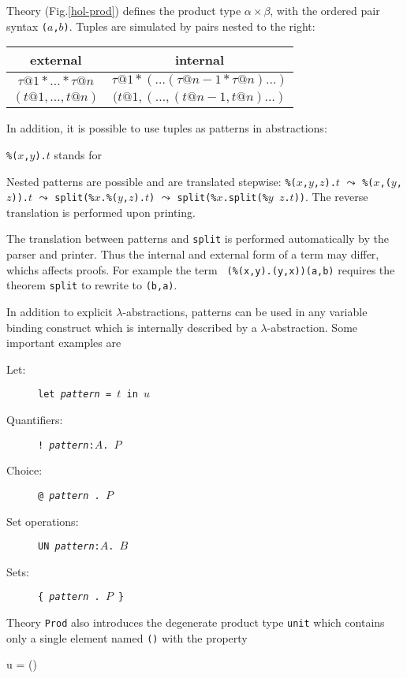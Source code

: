 Theory  (Fig.\ts\ref{hol-prod}) defines the product type
$\alpha\times\beta$, with the ordered pair syntax {\tt($a$,$b$)}. Tuples are
simulated by pairs nested to the right:
\begin{center}
\begin{tabular}{|c|c|}
\hline
external & internal \\
\hline
$\tau@1 * \dots * \tau@n$ & $\tau@1 * (\dots (\tau@{n-1} * \tau@n)\dots)$ \\
\hline
$(t@1,\dots,t@n)$ & $(t@1,(\dots,(t@{n-1},t@n)\dots)$ \\
\hline
\end{tabular}
\end{center}
In addition, it is possible to use tuples
as patterns in abstractions:
\begin{center}
{\tt\%($x$,$y$).$t$} \quad stands for 
\end{center}
Nested patterns are possible and are translated stepwise:
{\tt\%($x$,$y$,$z$).$t$} $\leadsto$ {\tt\%($x$,($y$,$z$)).$t$} $\leadsto$
{\tt split(\%$x$.\%($y$,$z$).$t$)} $\leadsto$ {\tt split(\%$x$.split(\%$y$
  $z$.$t$))}. The reverse translation is performed upon printing.
\begin{warn}
  The translation between patterns and {\tt split} is performed automatically
  by the parser and printer.  Thus the internal and external form of a term
  may differ, whichs affects proofs.  For example the term {\tt
    (\%(x,y).(y,x))(a,b)} requires the theorem {\tt split} to rewrite to
  {\tt(b,a)}.
\end{warn}
In addition to explicit $\lambda$-abstractions, patterns can be used in any
variable binding construct which is internally described by a
$\lambda$-abstraction. Some important examples are
\begin{description}
\item[Let:] {\tt let {\it pattern} = $t$ in $u$}
\item[Quantifiers:] {\tt !~{\it pattern}:$A$.~$P$}
\item[Choice:] {\underscoreon \tt @~{\it pattern}~.~$P$}
\item[Set operations:] {\tt UN~{\it pattern}:$A$.~$B$}
\item[Sets:] {\tt \{~{\it pattern}~.~$P$~\}}
\end{description}

Theory {\tt Prod} also introduces the degenerate product type {\tt unit}
which contains only a single element named {\tt()} with the property
\begin{ttbox}
       u = ()
\end{ttbox}
\bigskip


